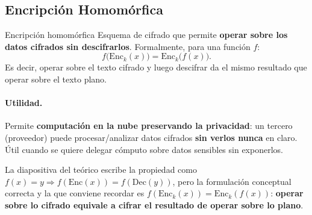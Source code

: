 \documentclass[../main.tex]{subfiles}
\begin{document}
\subsection{Encripción Homomórfica}

\begin{definicion}{Encripción homomórfica}
Esquema de cifrado que permite \textbf{operar sobre los datos cifrados sin
descifrarlos}. Formalmente, para una función $f$:
\[
f\big(\mathrm{Enc}_k(x)\big) = \mathrm{Enc}_k\big(f(x)\big).
\]
Es decir, operar sobre el texto cifrado y luego descifrar da el mismo resultado que
operar sobre el texto plano.
\end{definicion}

\paragraph{Utilidad.} Permite \textbf{computación en la nube preservando la privacidad}:
un tercero (proveedor) puede procesar/analizar datos cifrados \textbf{sin verlos nunca}
en claro. Útil cuando se quiere delegar cómputo sobre datos sensibles sin exponerlos.

\begin{ojo}
La diapositiva del teórico escribe la propiedad como $f(x)=y \Rightarrow f(\mathrm{Enc}(x))=f(\mathrm{Dec}(y))$,
pero la formulación conceptual correcta y la que conviene recordar es
$f(\mathrm{Enc}_k(x)) = \mathrm{Enc}_k(f(x))$: \textbf{operar sobre lo cifrado equivale a
cifrar el resultado de operar sobre lo plano}.
\end{ojo}
\end{document}
